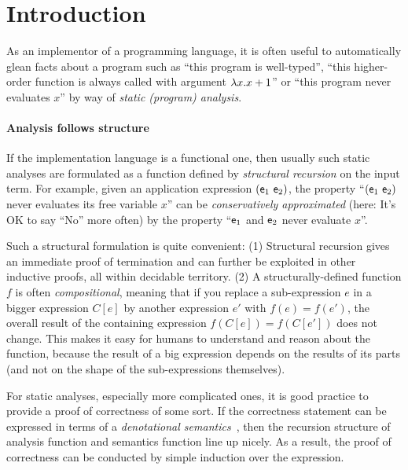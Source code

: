 \section{Introduction}
\label{sec:introduction}

As an implementor of a programming language, it is often useful to automatically
glean facts about a program such as ``this program is well-typed'', ``this
higher-order function is always called with argument $\lambda x. x+1$'' or ``this
program never evaluates $x$'' by way of \emph{static (program) analysis}.

\paragraph{Analysis follows structure}
If the implementation language is a functional one, then usually such static
analyses are formulated as a function defined by \emph{structural recursion} on
the input term.
For example, given an application expression $(\mathsf{e}_1~\mathsf{e}_2)$,
the property ``$(\mathsf{e}_1~\mathsf{e}_2)$ never evaluates its free variable $x$'' can be
\emph{conservatively approximated} (here: It's OK to say ``No'' more often) by
the property ``$\mathsf{e}_1$ and $\mathsf{e}_2$ never evaluate $x$''.

Such a structural formulation is quite convenient:
(1) Structural recursion gives an immediate proof of termination and can
    further be exploited in other inductive proofs, all within decidable
    territory.
(2) A structurally-defined function $f$ is often \emph{compositional}, meaning that
    if you replace a sub-expression $e$ in a bigger expression $C[e]$ by another
    expression $e'$ with $f(e) = f(e')$, the overall result
    of the containing expression $f(C[e]) = f(C[e'])$ does not change.
    This makes it easy for humans to understand and reason about the function,
    because the result of a big expression depends on the results of its parts
    (and not on the shape of the sub-expressions themselves).

For static analyses, especially more complicated ones, it is good practice to
provide a proof of correctness of some sort. If the correctness statement can
be expressed in terms of a \emph{denotational
semantics}~\cite{ScottStrachey:71}, then the recursion structure of analysis
function and semantics function line up nicely. As a result, the proof of
correctness can be conducted by simple induction over the expression.

